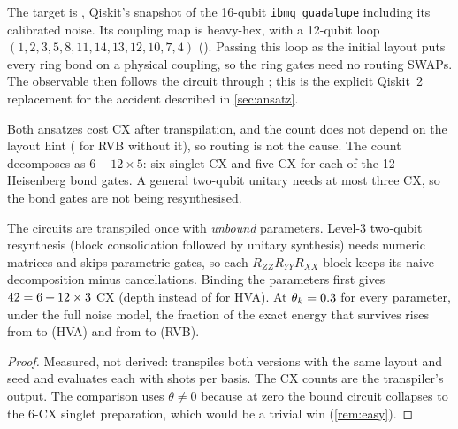 The target is , Qiskit's snapshot of the 16-qubit \texttt{ibmq\_guadalupe}
including its calibrated noise. Its coupling map is heavy-hex, with a 12-qubit loop
$(1,2,3,5,8,11,14,13,12,10,7,4)$ (). Passing this loop as the initial
layout puts every ring bond on a physical coupling, so the ring gates need no routing SWAPs. The
observable then follows the circuit through ; this is the explicit Qiskit~2
replacement for the accident described in \cref{sec:ansatz}.

\begin{table}[H]
  \centering
  
  \caption{Circuit cost on  (optimisation level 3, heavy-hex loop layout).
    ``PS energies'' is the number of energies one parameter-shift gradient needs
    (\cref{sec:m1}). ``Unshared'' is the circuit with one parameter per gate occurrence,
    which parameter shift requires; it has the same two-qubit cost.}
  \label{tab:circuits}
\end{table}

Both ansatzes cost \VCxHva{} CX after transpilation, and the count does not depend on the
layout hint (\VCxRvbNoLayout{} for RVB without it), so routing is not the cause. The count
decomposes as $6+12\times5$: six singlet CX and five CX for each of the 12 Heisenberg bond
gates. A general two-qubit unitary needs at most three CX, so the bond gates are not being
resynthesised.

\begin{prop}\label{prop:bound}
  The circuits are transpiled once with \emph{unbound} parameters. Level-3 two-qubit
  resynthesis (block consolidation followed by unitary synthesis) needs numeric matrices and
  skips parametric gates, so each $R_{ZZ}R_{YY}R_{XX}$ block keeps its naive decomposition
  minus cancellations. Binding the parameters first gives $42=6+12\times3$ CX (depth
  \VBoundDepthHva{} instead of \VDepthHva{} for HVA). At $\theta_k=0.3$ for every
  parameter, under the full  noise model, the fraction of the exact energy
  that survives rises from \VParamKeepHva{} to \VBoundKeepHva{} (HVA) and from \VParamKeepRvb{}
  to \VBoundKeepRvb{} (RVB).
\end{prop}

\begin{proof}
  Measured, not derived:  transpiles both versions with
  the same layout and seed and evaluates each with \VNoiseShots{} shots per basis. The CX
  counts are the transpiler's output. The comparison uses $\theta\neq0$ because at zero the
  bound circuit collapses to the 6-CX singlet preparation, which would be a trivial win
  (\cref{rem:easy}).
\end{proof}


